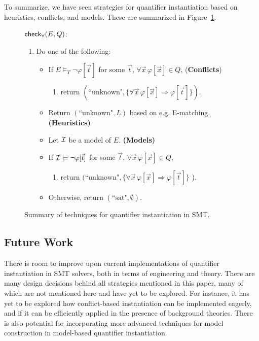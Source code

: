 \documentclass[oribibl]{llncs}
\begin{document}
To summarize,
we have seen strategies for quantifier instantiation
based on heuristics, conflicts, and models.
These are summarized in Figure~\ref{fig:smtqi}.

\begin{figure}[t]
\begin{framed}
$\small\mathsf{check}_\forall( E, Q )$: \\
\begin{enumerate}
\item[\ ] Do one of the following:
\begin{itemize}
\item If $E \models_T \neg \varphi[ \vec t ]$ for some $\vec t$, $\forall \vec x\, \varphi[ \vec x ] \in Q$, \hfill ({\bf Conflicts})
\begin{enumerate}
\item[\ ] return $( \text{``unknown"}, \{ \forall \vec x\, \varphi[ \vec x ]  \Rightarrow \varphi[ \vec t ] \} )$.
\end{enumerate}
\item Return $( \text{``unknown"}, L )$ based on e.g. E-matching. \hfill {\bf(Heuristics)}
\item Let $\mathcal{I}$ be a model of $E$. \hfill {\bf(Models)}
\item[\ ] If $\mathcal{I} \models \neg \varphi[ \vec t ]$ for some $\vec t$, $\forall \vec x\, \varphi[ \vec x ] \in Q$,
\begin{enumerate}
\item[\ ] return $( \text{``unknown"}, \{ \forall \vec x\, \varphi[ \vec x ]  \Rightarrow \varphi[ \vec t ] \}$ ).
\end{enumerate}
\item[\ ] Otherwise, return $( \text{``sat"}, \emptyset )$.
\end{itemize}
\end{enumerate}
\end{framed}
\vspace{-2ex}
\caption{Summary of techniques for quantifier instantiation in SMT.
\label{fig:smtqi}}
\end{figure}


\subsection{Future Work}

There is room to improve upon current implementations of quantifier instantiation in SMT solvers,
both in terms of engineering and theory.
There are many design decisions behind all strategies mentioned in this paper, 
many of which are not mentioned here and have yet to be explored.
For instance, it has yet to be explored how conflict-based instantiation can be implemented eagerly,
and if it can be efficiently applied in the presence of background theories.
There is also potential for incorporating more advanced techniques for model construction in model-based quantifier instantiation.
\end{document}
